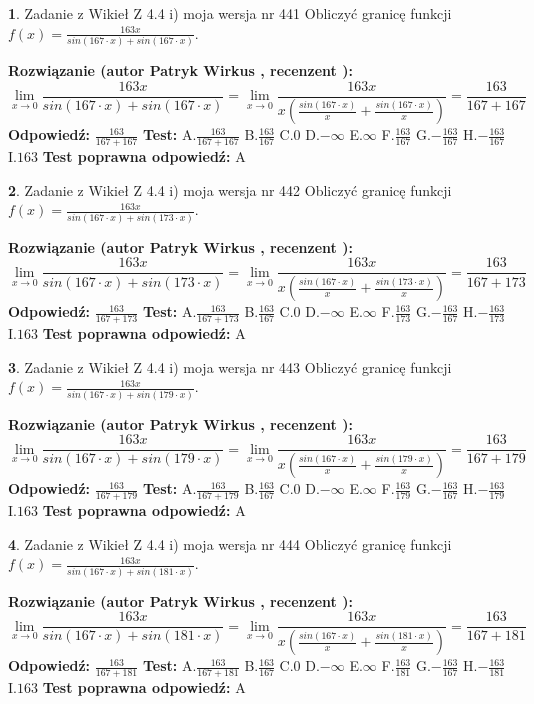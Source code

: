 \documentclass[12pt, a4paper]{article}
\theoremstyle{definition} %
\newtheorem{zad}{}
\newcommand{\zadStart}[1]{\begin{zad}#1\newline}
\newcommand{\zadStop}{\end{zad}}
\newcommand{\rozwStart}[2]{\noindent \textbf{Rozwiązanie (autor #1 , recenzent #2): }\newline}
\newcommand{\rozwStop}{\newline}
\newcommand{\odpStart}{\noindent \textbf{Odpowiedź:}\newline}
\newcommand{\odpStop}{\newline}
\newcommand{\testStart}{\noindent \textbf{Test:}\newline}
\newcommand{\testStop}{\newline}
\newcommand{\kluczStart}{\noindent \textbf{Test poprawna odpowiedź:}\newline}
\newcommand{\kluczStop}{\newline}
\begin{document}
\zadStart{Zadanie z Wikieł Z 4.4 i) moja wersja nr 441}
Obliczyć granicę funkcji $f(x)=\frac{163x}{sin(167\cdot x) +sin(167\cdot x)}$.
\zadStop
\rozwStart{Patryk Wirkus}{}
$$\lim\limits_{x\to 0}\frac{163x}{sin(167\cdot x) +sin(167\cdot x)}=\lim\limits_{x\to 0}\frac{163x}{x(\frac{sin(167\cdot x)}{x}+\frac{sin(167\cdot x)}{x})}=\frac{163}{167+167}$$
\rozwStop
\odpStart
$\frac{163}{167+167}$
\odpStop
\testStart
A.$\frac{163}{167+167}$
B.$\frac{163}{167}$
C.$0$
D.$-\infty$
E.$\infty$
F.$\frac{163}{167}$
G.$-\frac{163}{167}$
H.$-\frac{163}{167}$
I.$163$
\testStop
\kluczStart
A
\kluczStop



\zadStart{Zadanie z Wikieł Z 4.4 i) moja wersja nr 442}
Obliczyć granicę funkcji $f(x)=\frac{163x}{sin(167\cdot x) +sin(173\cdot x)}$.
\zadStop
\rozwStart{Patryk Wirkus}{}
$$\lim\limits_{x\to 0}\frac{163x}{sin(167\cdot x) +sin(173\cdot x)}=\lim\limits_{x\to 0}\frac{163x}{x(\frac{sin(167\cdot x)}{x}+\frac{sin(173\cdot x)}{x})}=\frac{163}{167+173}$$
\rozwStop
\odpStart
$\frac{163}{167+173}$
\odpStop
\testStart
A.$\frac{163}{167+173}$
B.$\frac{163}{167}$
C.$0$
D.$-\infty$
E.$\infty$
F.$\frac{163}{173}$
G.$-\frac{163}{167}$
H.$-\frac{163}{173}$
I.$163$
\testStop
\kluczStart
A
\kluczStop



\zadStart{Zadanie z Wikieł Z 4.4 i) moja wersja nr 443}
Obliczyć granicę funkcji $f(x)=\frac{163x}{sin(167\cdot x) +sin(179\cdot x)}$.
\zadStop
\rozwStart{Patryk Wirkus}{}
$$\lim\limits_{x\to 0}\frac{163x}{sin(167\cdot x) +sin(179\cdot x)}=\lim\limits_{x\to 0}\frac{163x}{x(\frac{sin(167\cdot x)}{x}+\frac{sin(179\cdot x)}{x})}=\frac{163}{167+179}$$
\rozwStop
\odpStart
$\frac{163}{167+179}$
\odpStop
\testStart
A.$\frac{163}{167+179}$
B.$\frac{163}{167}$
C.$0$
D.$-\infty$
E.$\infty$
F.$\frac{163}{179}$
G.$-\frac{163}{167}$
H.$-\frac{163}{179}$
I.$163$
\testStop
\kluczStart
A
\kluczStop



\zadStart{Zadanie z Wikieł Z 4.4 i) moja wersja nr 444}
Obliczyć granicę funkcji $f(x)=\frac{163x}{sin(167\cdot x) +sin(181\cdot x)}$.
\zadStop
\rozwStart{Patryk Wirkus}{}
$$\lim\limits_{x\to 0}\frac{163x}{sin(167\cdot x) +sin(181\cdot x)}=\lim\limits_{x\to 0}\frac{163x}{x(\frac{sin(167\cdot x)}{x}+\frac{sin(181\cdot x)}{x})}=\frac{163}{167+181}$$
\rozwStop
\odpStart
$\frac{163}{167+181}$
\odpStop
\testStart
A.$\frac{163}{167+181}$
B.$\frac{163}{167}$
C.$0$
D.$-\infty$
E.$\infty$
F.$\frac{163}{181}$
G.$-\frac{163}{167}$
H.$-\frac{163}{181}$
I.$163$
\testStop
\kluczStart
A
\kluczStop
\end{document}
